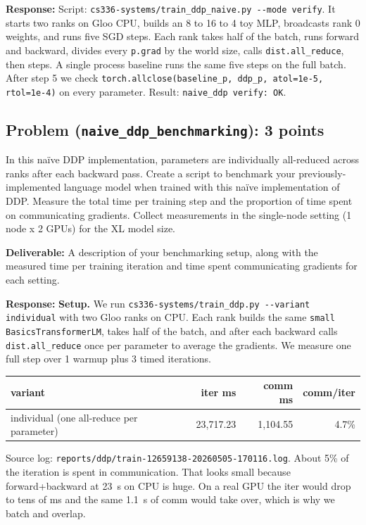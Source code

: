 \documentclass[11pt]{article}
\begin{document}
\textbf{Response:} Script: \verb|cs336-systems/train_ddp_naive.py --mode verify|. It starts two ranks on Gloo CPU, builds an 8 to 16 to 4 toy MLP, broadcasts rank 0 weights, and runs five SGD steps. Each rank takes half of the batch, runs forward and backward, divides every \verb|p.grad| by the world size, calls \verb|dist.all_reduce|, then steps. A single process baseline runs the same five steps on the full batch. After step 5 we check \verb|torch.allclose(baseline_p, ddp_p, atol=1e-5, rtol=1e-4)| on every parameter. Result: \verb|naive_ddp verify: OK|.

\subsection*{Problem (\texttt{naive\_ddp\_benchmarking}): 3 points}

In this naïve DDP implementation, parameters are individually all-reduced across ranks after each backward pass. Create a script to benchmark your previously-implemented language model when trained with this naïve implementation of DDP. Measure the total time per training step and the proportion of time spent on communicating gradients. Collect measurements in the single-node setting (1 node x 2 GPUs) for the XL model size.

\textbf{Deliverable:} A description of your benchmarking setup, along with the measured time per training iteration and time spent communicating gradients for each setting.

\textbf{Response:}
\textbf{Setup.} We run \verb|cs336-systems/train_ddp.py --variant individual| with two Gloo ranks on CPU. Each rank builds the same \texttt{small} \verb|BasicsTransformerLM|, takes half of the batch, and after each backward calls \verb|dist.all_reduce| once per parameter to average the gradients. We measure one full step over 1 warmup plus 3 timed iterations.

\begin{table}[H]
\centering\small
\begin{tabular}{lrrr}
\toprule
variant & iter ms & comm ms & comm/iter \\
\midrule
individual (one all-reduce per parameter) & 23{,}717.23 & 1{,}104.55 & 4.7\% \\
\bottomrule
\end{tabular}
\end{table}

\noindent Source log: \verb|reports/ddp/train-12659138-20260505-170116.log|. About 5\% of the iteration is spent in communication. That looks small because forward+backward at 23~s on CPU is huge. On a real GPU the iter would drop to tens of ms and the same 1.1~s of comm would take over, which is why we batch and overlap.
\end{document}
